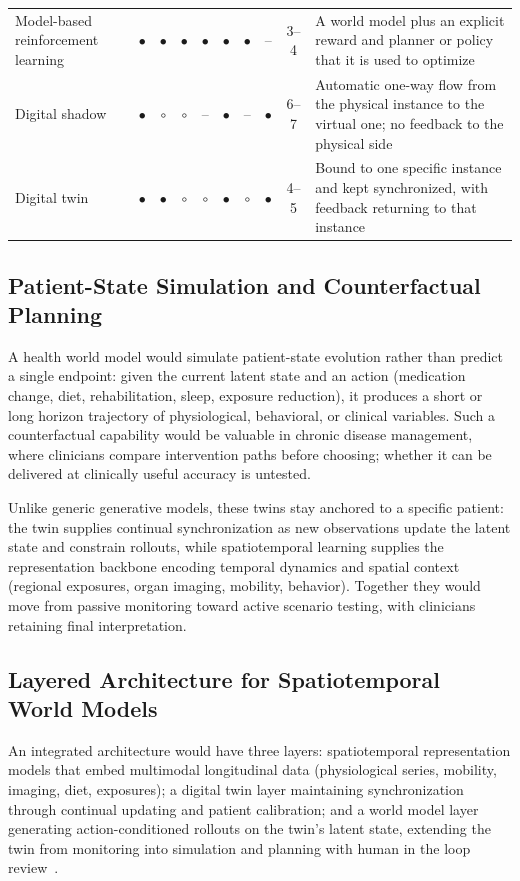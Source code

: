 \documentclass[journal]{IEEEtran}
\begin{document}
\begin{table}[t]
\begin{tabularx}{\textwidth}{>{\raggedright\arraybackslash}p{4.1cm} ccccccc c >{\raggedright\arraybackslash}X}
\addlinespace[2pt]
\rowcolor{tablestripe}Model-based reinforcement learning & $\bullet$ & $\bullet$ & $\bullet$ & $\bullet$ & $\bullet$ & $\bullet$ & -- & 3--4 & A world model plus an explicit reward and planner or policy that it is used to optimize \\
\addlinespace[2pt]
Digital shadow & $\bullet$ & $\circ$ & $\circ$ & -- & $\bullet$ & -- & $\bullet$ & 6--7 & Automatic one-way flow from the physical instance to the virtual one; no feedback to the physical side \\
\addlinespace[2pt]
\rowcolor{tablestripe}Digital twin & $\bullet$ & $\bullet$ & $\circ$ & $\circ$ & $\bullet$ & $\circ$ & $\bullet$ & 4--5 & Bound to one specific instance and kept synchronized, with feedback returning to that instance \\
\bottomrule
\end{tabularx}
\end{table}
\fi

\subsection{Patient-State Simulation and Counterfactual Planning}
A health world model would simulate patient-state evolution rather than predict a single endpoint: given the current latent state and an action (medication change, diet, rehabilitation, sleep, exposure reduction), it produces a short or long horizon trajectory of physiological, behavioral, or clinical variables. Such a counterfactual capability would be valuable in chronic disease management, where clinicians compare intervention paths before choosing; whether it can be delivered at clinically useful accuracy is untested.

Unlike generic generative models, these twins stay anchored to a specific patient: the twin supplies continual synchronization as new observations update the latent state and constrain rollouts, while spatiotemporal learning supplies the representation backbone encoding temporal dynamics and spatial context (regional exposures, organ imaging, mobility, behavior). Together they would move from passive monitoring toward active scenario testing, with clinicians retaining final interpretation.

\subsection{Layered Architecture for Spatiotemporal World Models}
An integrated architecture would have three layers: spatiotemporal representation models that embed multimodal longitudinal data (physiological series, mobility, imaging, diet, exposures); a digital twin layer maintaining synchronization through continual updating and patient calibration; and a world model layer generating action-conditioned rollouts on the twin's latent state, extending the twin from monitoring into simulation and planning with human in the loop review~\cite{Sadee2025MedicalDT}.
\end{document}

